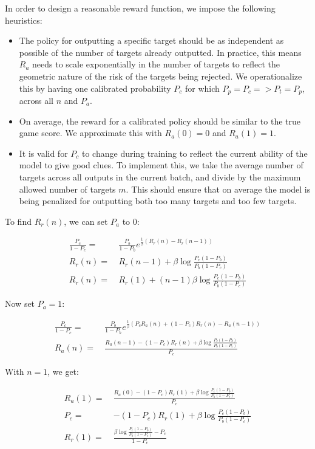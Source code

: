 \documentclass{article}
\begin{document}
In order to design a reasonable reward function, we impose the following heuristics:
\begin{itemize}
  \item The policy for outputting a specific target should be as independent as possible of the number of targets already outputted. In practice, this means $R_a$ needs to scale exponentially in the number of targets to reflect the geometric nature of the risk of the targets being rejected. We operationalize this by having one calibrated probability $P_c$ for which $P_p = P_c => P_t = P_p$, across all $n$ and $P_a$.
  \item On average, the reward for a calibrated policy should be similar to the true game score. We approximate this with $R_a(0) = 0$ and $R_a(1) = 1$.
  \item It is valid for $P_c$ to change during training to reflect the current ability of the model to give good clues. To implement this, we take the average number of targets across all outputs in the current batch, and divide by the maximum allowed number of targets $m$. This should ensure that on average the model is being penalized for outputting both too many targets and too few targets.
\end{itemize}

\pagebreak

To find $R_r(n)$, we can set $P_a$ to $0$:

\begin{align*}
  \frac{P_c}{1 - P_c} = \: & \frac{P_b}{1 - P_b} e^{\frac{1}{\beta} \left(R_r(n) - R_r(n-1)\right)} \\
  R_r(n) = \:              & R_r(n-1) + \beta \log \frac{P_c (1 - P_b)}{P_b(1 - P_c)}               \\
  R_r(n) = \:              & R_r(1) + (n - 1) \beta \log \frac{P_c (1 - P_b)}{P_b(1 - P_c)}
\end{align*}

Now set $P_a = 1$:

\begin{align*}
  \frac{P_c}{1 - P_c} = \: & \frac{P_b}{1 - P_b} e^{\frac{1}{\beta} \left(P_cR_a(n) + (1 - P_c)R_r(n) - R_a(n - 1)\right)} \\
  R_a(n) = \:              & \frac{R_a(n - 1) - (1 - P_c)R_r(n) + \beta \log \frac{P_c (1 - P_b)}{P_b (1 - P_c)}}{P_c}
\end{align*}

With $n = 1$, we get:

\begin{align*}
  R_a(1) = \: & \frac{R_a(0) - (1 - P_c)R_r(1) + \beta \log \frac{P_c (1 - P_b)}{P_b (1 - P_c)}}{P_c} \\
  P_c = \:    & - (1 - P_c)R_r(1) + \beta \log \frac{P_c (1 - P_b)}{P_b (1 - P_c)}                    \\
  R_r(1) = \: & \frac{\beta \log \frac{P_c (1 - P_b)}{P_b (1 - P_c)} - P_c}{1 - P_c}
\end{align*}
\end{document}
